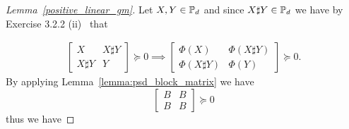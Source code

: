 \documentclass[twoside,11pt]{article}
\begin{document}
\begin{proof}[Lemma~\ref{positive_linear_gm}]
        Let $X, Y \in \mathbb{P}_d$ and since $X \sharp Y \in \mathbb{P}_d$ we have by Exercise 3.2.2 (ii)~\cite{bhatia07positivedefinitematrices} that 

         \begin{equation}\label{eq:Phi_succ_0}
        \begin{aligned}
        \begin{bmatrix}
            X  & X \sharp Y  
            \\ X\sharp Y   &Y 
        \end{bmatrix} \succeq 0 \implies 
\begin{bmatrix}
            \Phi(X)  & \Phi\left(X \sharp Y\right)  
            \\ \Phi\left(X\sharp Y\right)   &\Phi(Y) 
        \end{bmatrix}
        \succeq 0 .
        \end{aligned}
    \end{equation}
By applying Lemma~\ref{lemma:psd_block_matrix} we have
\[
\begin{bmatrix}
            B & B \\
            B & B
        \end{bmatrix} \succeq 0
\]
thus we have


\end{proof}
\end{document}
